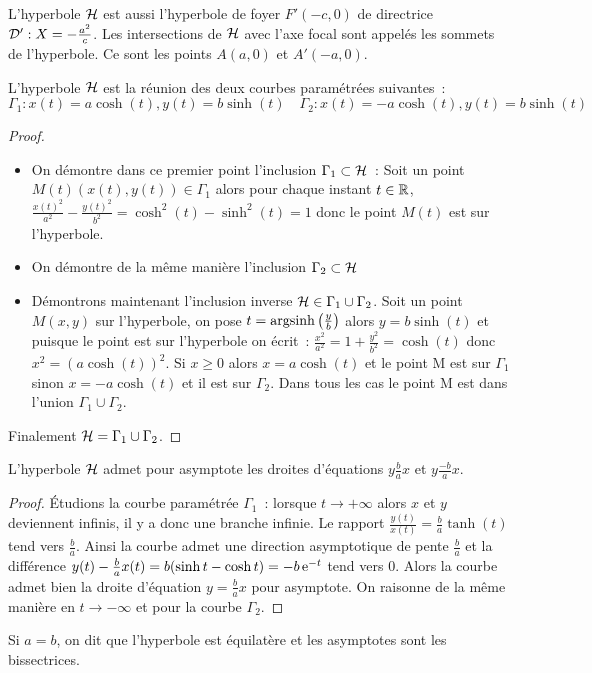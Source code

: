 L'hyperbole \(\mathcal{H}\) est aussi l'hyperbole de foyer \(F'(-c, 0)\) de directrice 
\(\mathcal{D} ':X = -\frac{a^2}{c}\). Les intersections de \(\mathcal{H}\) avec l'axe focal sont 
appelés les sommets de l'hyperbole. Ce sont les points \(A(a, 0)\) et 
\(A'(-a, 0)\).
\begin{prop}
  L'hyperbole \(\mathcal{H}\) est la réunion des deux courbes paramétrées suivantes~:
  \begin{equation}
    \Gamma_1 : x(t) = a\cosh(t), y(t) = b\sinh(t) \quad \Gamma_2 : x(t) = -a\cosh(t), 
    y(t) = b\sinh(t)
  \end{equation}
\end{prop}
\begin{proof}
  \begin{itemize}
    \item On démontre dans ce premier point l'inclusion \(\Gamma_1 \subset 
      \mathcal{H}\)~: Soit un point \(M(t)(x(t),y(t)) \in \Gamma_1\) alors pour chaque 
      instant \(t \in \mathbb{R}\), 
      \(\frac{x(t)^2}{a^2}-\frac{y(t)^2}{b^2} = \cosh^2(t)-\sinh^2(t) = 1\) donc le 
      point \(M(t)\) est sur l'hyperbole.
    \item On démontre de la même manière l'inclusion  \(\Gamma_2 \subset \mathcal{H}\)
    \item Démontrons maintenant l'inclusion inverse \(\mathcal{H} \in 
      \Gamma_1\cup\Gamma_2\). Soit un point \(M(x, y)\) sur l'hyperbole, on pose 
      \(t = \operatorname{argsinh}\left(\frac{y}{b}\right)\) alors \(y = b\sinh(t)\) et puisque le 
      point est sur l'hyperbole on écrit~: 
      \(\frac{x^2}{a^2} = 1 + \frac{y^2}{b^2} = \cosh(t)\) donc \(x^2 = (a\cosh(t))^2\). 
      Si \(x\geqslant 0\) alors \(x = a\cosh(t)\) et le point M est sur 
      \(\Gamma_1\) sinon \(x = -a\cosh(t)\) et il est sur \(\Gamma_2\). Dans tous 
      les cas le point M est dans l'union \(\Gamma_1 \cup \Gamma_2\).
  \end{itemize}
  Finalement \(\mathcal{H} = \Gamma_1 \cup \Gamma_2\).
\end{proof}
\begin{prop}
  L'hyperbole \(\mathcal{H}\) admet pour asymptote les droites d'équations 
  \(y\frac{b}{a}x\) et \(y\frac{-b}{a}x\).
\end{prop}
\begin{proof}
  Étudions la courbe paramétrée \(\Gamma_1\)~: lorsque \(t \to +\infty\) alors 
  \(x\) et \(y\) deviennent infinis, il y a donc une branche infinie. Le rapport 
  \(\frac{y(t)}{x(t)} = \frac{b}{a} \tanh(t)\) tend vers \(\frac{b}{a}\). Ainsi la 
  courbe admet une direction asymptotique de pente \(\frac{b}{a}\) et la 
  différence \(y(t) -\frac{b}{a}x(t) = b(\sinh t -\cosh t) = -b\operatorname{e}^{-t}\) tend vers 
  0. Alors la courbe admet bien la droite d'équation \(y = \frac{b}{a}x\) pour 
  asymptote. On raisonne de la même manière en \(t\to -\infty\) et pour la 
  courbe \(\Gamma_2\).
\end{proof}
Si \(a = b\), on dit que l'hyperbole est équilatère et les asymptotes sont les 
bissectrices.



